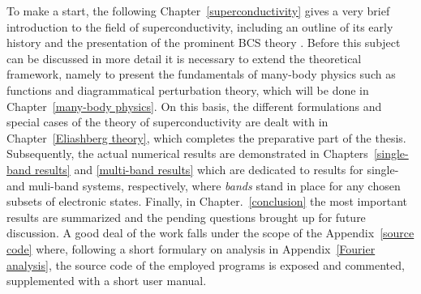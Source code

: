 To make a start, the following Chapter~\ref{superconductivity} gives a very
brief introduction to the field of superconductivity, including an outline of
its early history and the presentation of the prominent BCS theory \cites
{BardeenCooperSchrieffer57a} {BardeenCooperSchrieffer57b}. Before this subject
can be discussed in more detail it is necessary to extend the theoretical
framework, namely to present the fundamentals of many-body physics such as
 functions and diagrammatical perturbation theory, which will be
done in Chapter~\ref{many-body physics}. On this basis, the different
formulations and special cases of the  theory of
superconductivity are dealt with in Chapter~\ref{Eliashberg theory}, which
completes the preparative part of the thesis. Subsequently, the actual numerical
results are demonstrated in Chapters~\ref{single-band results} and
\ref{multi-band results} which are dedicated to results for single- and
muli-band systems, respectively, where \emph{bands} stand in place for any
chosen subsets of electronic states. Finally, in Chapter.~\ref{conclusion} the
most important results are summarized and the pending questions brought up for
future discussion. A good deal of the work falls under the scope of the
Appendix~\ref{source code} where, following a short formulary on 
analysis in Appendix~\ref{Fourier analysis}, the source code of the employed
programs is exposed and commented, supplemented with a short user manual.
